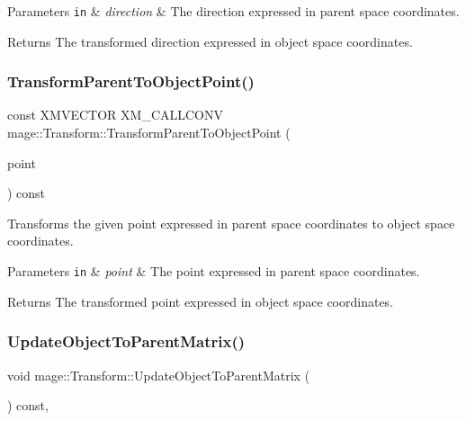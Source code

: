 \begin{DoxyParams}[1]{Parameters}
\mbox{\tt in}  & {\em direction} & The direction expressed in parent space coordinates. \\
\hline
\end{DoxyParams}
\begin{DoxyReturn}{Returns}
The transformed direction expressed in object space coordinates. 
\end{DoxyReturn}
\hypertarget{classmage_1_1_transform_a4b420feb6f839d045a0239056b47772d}{}\label{classmage_1_1_transform_a4b420feb6f839d045a0239056b47772d} 
\subsubsection{\texorpdfstring{Transform\+Parent\+To\+Object\+Point()}{TransformParentToObjectPoint()}}
{\footnotesize\ttfamily const X\+M\+V\+E\+C\+T\+OR X\+M\+\_\+\+C\+A\+L\+L\+C\+O\+NV mage\+::\+Transform\+::\+Transform\+Parent\+To\+Object\+Point (\begin{DoxyParamCaption}\item[{F\+X\+M\+V\+E\+C\+T\+OR}]{point }\end{DoxyParamCaption}) const\hspace{0.3cm}{\ttfamily [noexcept]}}

Transforms the given point expressed in parent space coordinates to object space coordinates.


\begin{DoxyParams}[1]{Parameters}
\mbox{\tt in}  & {\em point} & The point expressed in parent space coordinates. \\
\hline
\end{DoxyParams}
\begin{DoxyReturn}{Returns}
The transformed point expressed in object space coordinates. 
\end{DoxyReturn}
\hypertarget{classmage_1_1_transform_ae959687d6ffe73bda0a71f2f6f4b9dbe}{}\label{classmage_1_1_transform_ae959687d6ffe73bda0a71f2f6f4b9dbe} 
\subsubsection{\texorpdfstring{Update\+Object\+To\+Parent\+Matrix()}{UpdateObjectToParentMatrix()}}
{\footnotesize\ttfamily void mage\+::\+Transform\+::\+Update\+Object\+To\+Parent\+Matrix (\begin{DoxyParamCaption}{ }\end{DoxyParamCaption}) const\hspace{0.3cm}{\ttfamily [private]}, {\ttfamily [noexcept]}}

